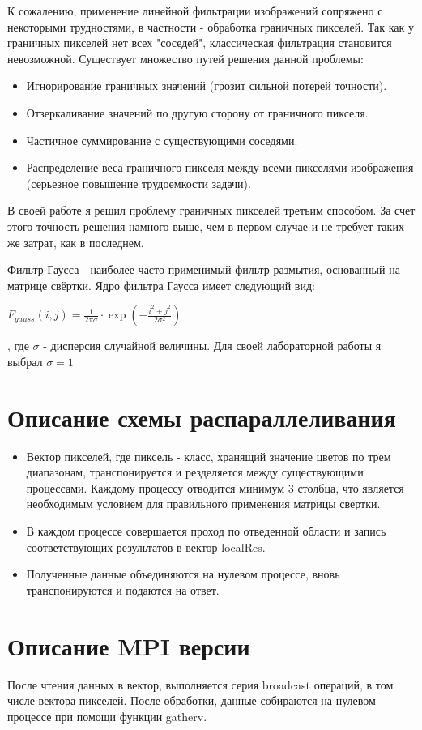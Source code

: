\documentclass[14pt]{article}
\begin{document}
К сожалению, применение линейной фильтрации изображений сопряжено с некоторыми трудностями, в частности - обработка граничных пикселей. Так как у граничных пикселей нет всех "соседей", классическая фильтрация становится невозможной. Существует множество путей решения данной проблемы:
\begin{itemize}
    \item Игнорирование граничных значений (грозит сильной потерей точности).
    \item Отзеркаливание значений по другую сторону от граничного пикселя.
    \item Частичное суммирование с существующими соседями.
    \item Распределение веса граничного пикселя между всеми пикселями изображения (серьезное повышение трудоемкости задачи).
\end{itemize}

В своей работе я решил проблему граничных пикселей третьим способом. За счет этого точность решения намного выше, чем в первом случае и не требует таких же затрат, как в последнем.

Фильтр Гаусса - наиболее часто применимый фильтр размытия, основанный на матрице свёртки. Ядро фильтра Гаусса имеет следующий вид:
\begin{center}
    $F_{gauss}(i, j) = \frac{1}{2\pi \sigma} \cdot \exp{(-\frac{i^2 + j^2}{2\sigma^2})}$
\end{center}
, где $\sigma$ - дисперсия случайной величины. Для своей лабораторной работы я выбрал $\sigma = 1$ 

\section{Описание схемы распараллеливания}
\begin{itemize}
    \item Вектор пикселей, где пиксель - класс, хранящий значение цветов по трем диапазонам, транспонируется и резделяется между существующими процессами. Каждому процессу отводится минимум 3 столбца, что является необходимым условием для правильного применения матрицы свертки.
    \item В каждом процессе совершается проход по отведенной области и запись соответствующих результатов в вектор localRes.
    \item Полученные данные объединяются на нулевом процессе, вновь транспонируются и подаются на ответ. 
\end{itemize}
\section{Описание MPI версии}
После чтения данных в вектор, выполняется серия broadcast операций, в том числе вектора пикселей. После обработки, данные собираются на нулевом процессе при помощи функции gatherv.
\newpage
\end{document}
